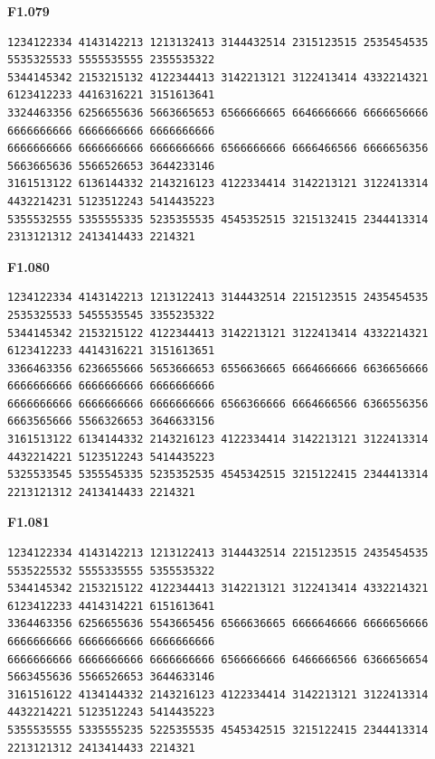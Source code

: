 \noindent\begin{minipage}{\linewidth}\textbf{F1.079}
\begin{lstlisting}
1234122334 4143142213 1213132413 3144432514 2315123515 2535454535 5535325533 5555535555 2355535322
5344145342 2153215132 4122344413 3142213121 3122413414 4332214321 6123412233 4416316221 3151613641
3324463356 6256655636 5663665653 6566666665 6646666666 6666656666 6666666666 6666666666 6666666666
6666666666 6666666666 6666666666 6566666666 6666466566 6666656356 5663665636 5566526653 3644233146
3161513122 6136144332 2143216123 4122334414 3142213121 3122413314 4432214231 5123512243 5414435223
5355532555 5355555335 5235355535 4545352515 3215132415 2344413314 2313121312 2413414433 2214321
\end{lstlisting}
\end{minipage}\par\smallskip

\noindent\begin{minipage}{\linewidth}\textbf{F1.080}
\begin{lstlisting}
1234122334 4143142213 1213122413 3144432514 2215123515 2435454535 2535325533 5455535545 3355235322
5344145342 2153215122 4122344413 3142213121 3122413414 4332214321 6123412233 4414316221 3151613651
3366463356 6236655666 5653666653 6556636665 6664666666 6636656666 6666666666 6666666666 6666666666
6666666666 6666666666 6666666666 6566366666 6664666566 6366556356 6663565666 5566326653 3646633156
3161513122 6134144332 2143216123 4122334414 3142213121 3122413314 4432214221 5123512243 5414435223
5325533545 5355545335 5235352535 4545342515 3215122415 2344413314 2213121312 2413414433 2214321
\end{lstlisting}
\end{minipage}\par\smallskip

\noindent\begin{minipage}{\linewidth}\textbf{F1.081}
\begin{lstlisting}
1234122334 4143142213 1213122413 3144432514 2215123515 2435454535 5535225532 5555335555 5355535322
5344145342 2153215122 4122344413 3142213121 3122413414 4332214321 6123412233 4414314221 6151613641
3364463356 6256655636 5543665456 6566636665 6666646666 6666656666 6666666666 6666666666 6666666666
6666666666 6666666666 6666666666 6566666666 6466666566 6366656654 5663455636 5566526653 3644633146
3161516122 4134144332 2143216123 4122334414 3142213121 3122413314 4432214221 5123512243 5414435223
5355535555 5335555235 5225355535 4545342515 3215122415 2344413314 2213121312 2413414433 2214321
\end{lstlisting}
\end{minipage}\par\smallskip

